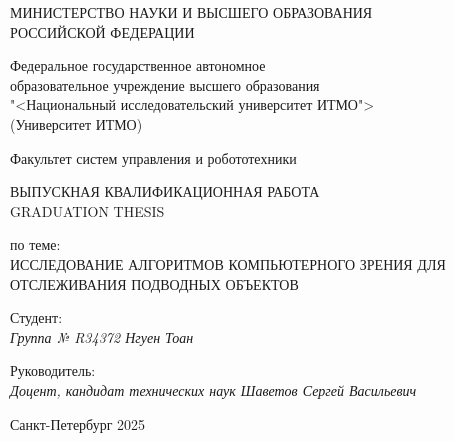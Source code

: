 \thispagestyle{empty}

\begin{center}
    МИНИСТЕРСТВО НАУКИ И ВЫСШЕГО ОБРАЗОВАНИЯ \\ РОССИЙСКОЙ ФЕДЕРАЦИИ

    \vspace{20pt}

    Федеральное государственное автономное \\ образовательное учреждение высшего образования \\
    "<Национальный исследовательский университет ИТМО"> \\
    (Университет ИТМО)

    \vspace{20pt}

    Факультет систем управления и робототехники \\
\end{center}

\vfill

\begin{center}
    ВЫПУСКНАЯ КВАЛИФИКАЦИОННАЯ РАБОТА \\  
    GRADUATION THESIS \\

    \vspace{20pt}

    по теме: \\
    \uppercase{Исследование алгоритмов компьютерного зрения для отслеживания подводных объектов}
\end{center}

\vfill

    \noindent Студент: \\
    \textit{Группа № R34372 \hfill Нгуен Тоан}

    \vspace{20pt}

    \noindent Руководитель: \\
    \textit{Доцент, кандидат технических наук \hfill Шаветов Сергей Васильевич}

\vfill

\begin{center}
    Санкт-Петербург 2025
\end{center}